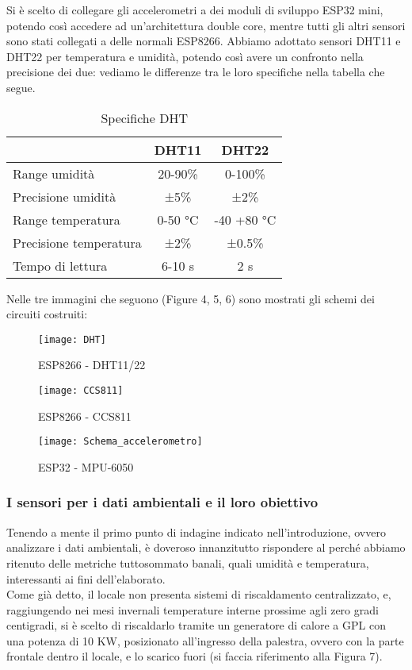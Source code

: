 \documentclass[fleqn,10pt]{SelfArx} %
\begin{document}
Si è scelto di collegare gli accelerometri a dei moduli di sviluppo ESP32 mini, potendo così accedere ad 
un'architettura double core, mentre tutti gli altri sensori sono stati collegati a delle normali ESP8266. 
Abbiamo adottato sensori DHT11 e DHT22 per temperatura e umidità, potendo così avere un confronto nella 
precisione dei due: vediamo le differenze tra le loro specifiche nella tabella che segue.

\begin{table}[hbt]
	\caption{Specifiche DHT}
	\centering
	\begin{tabular}{lcc}
		\toprule
			 & \textbf{DHT11} & \textbf{DHT22} \\
		\midrule
		Range umidità & 20-90\% & 0-100\% \\
		Precisione umidità & ±5\% & ±2\% \\
		Range temperatura & 0-50 °C & -40 +80 °C \\
		Precisione temperatura & ±2\% & ±0.5\% \\
		Tempo di lettura & 6-10 s & 2 s \\
		\bottomrule
	\end{tabular}
	\label{tab:label}
\end{table}

Nelle tre immagini che seguono (Figure 4, 5, 6) sono mostrati gli schemi dei circuiti costruiti: 

\begin{figure}[htb!]\centering
	\texttt{[image: DHT]}
	\caption{ESP8266 - DHT11/22}
	\label{fig:DHT11/22}
\end{figure}

\begin{figure}[htb!]\centering
	\texttt{[image: CCS811]}
	\caption{ESP8266 - CCS811}
	\label{fig:CCS811}
\end{figure}

\begin{figure}[htb!]\centering
	\texttt{[image: Schema\_accelerometro]}
	\caption{ESP32 - MPU-6050}
	\label{fig:MPU-6050}
\end{figure}

\subsubsection{I sensori per i dati ambientali e il loro obiettivo}
Tenendo a mente il primo punto di indagine indicato nell'introduzione, ovvero analizzare i dati ambientali, è doveroso 
innanzitutto rispondere al perché abbiamo ritenuto delle metriche tuttosommato banali, 
quali umidità e temperatura, interessanti ai fini dell'elaborato.\\
Come già detto, il locale non presenta sistemi di riscaldamento centralizzato, e, raggiungendo nei mesi invernali 
temperature interne prossime agli zero gradi centigradi, si è scelto di riscaldarlo tramite un generatore di calore a 
GPL con una potenza di 10 KW, posizionato all'ingresso della palestra, ovvero con la parte frontale dentro il locale, 
e lo scarico fuori (si faccia riferimento alla Figura 7).\\
\end{document}
